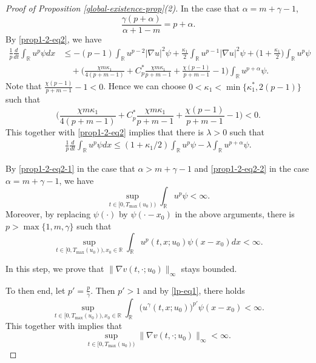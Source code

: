 \documentclass[11pt]{article} %
\theoremstyle{remark}
\theoremstyle{remark}
\numberwithin{equation}{section}
\numberwithin{figure}{section}
\numberwithin{table}{section}
\newcommand\RR{\ensuremath{\mathbb{R}}}
\begin{document}
\begin{proof} [Proof of Proposition \ref{global-existence-prop}(2)]
In the case that  $\alpha=m+\gamma-1$,  
$$
\frac{\gamma(p+\alpha)}{\alpha+1-m}=p+\alpha.
$$ 
By \eqref{prop1-2-eq2}, we
have
 \begin{align*}
\frac{1}{p}\frac{d}{dt}\int_{\RR} u^p \psi dx&\le -(p -1)\int_{\RR} u^{p-2}|\nabla u|^2\psi
+\frac{\kappa_1}{2}\int_{\RR} u^{p-1} |\nabla u|^2 \psi +\big(1+\frac{\kappa_1}{2}\big)\int_{\RR} u^p \psi\nonumber\\
&\quad + \Big(\frac{\chi m \kappa_1}{4(p+m-1)}+C^*_p \frac{\chi m \kappa_1}{p+m-1} +\frac{\chi(p - 1)}{p+m-1}-1\Big)\int_{\RR} u^{p+\alpha}\psi.
    \end{align*}
Note that $\frac{\chi(p - 1)}{p+m-1}-1<0$. Hence we can 
choose $0<\kappa_1<\min\{\kappa_1^*,2(p-1)\}$ such that
$$
\Big(\frac{\chi m \kappa_1}{4(p+m-1)}+C^*_p \frac{\chi m \kappa_1}{p+m-1} +\frac{\chi(p - 1)}{p+m-1}-1\Big)<0.
$$
This together with \eqref{prop1-2-eq2} implies that   there is  $\lambda>0$ such that
\begin{align}
\label{prop1-2-eq2-2}
\frac{1}{p}\frac{d}{dt}\int_{\RR} u^p \psi dx\le 
(1+\kappa_1/2)\int_{\RR} u^p\psi -\lambda \int_{\RR} u^{p+\alpha}\psi.
\end{align}


By \eqref{prop1-2-eq2-1} in the case that $\alpha>m+\gamma-1$ and \eqref{prop1-2-eq2-2} in the case $\alpha=m+\gamma-1$, we have 
\begin{equation*}
\sup_{t\in [0,T_{\max}(u_0))}\int_{\RR} u^p\psi<\infty.
\end{equation*}
Moreover, 
by replacing $\psi(\cdot)$ by $\psi(\cdot-x_0)$ in the above arguments,  there is $p>\max\{1,m,\gamma\}$ such that
\begin{equation}
\label{lp-eq1}
\sup_{t\in [0,T_{\max}(u_0)),x_0\in\RR} \int_{\RR} u^p(t,x;u_0)\psi(x-x_0)dx<\infty.
\end{equation}



 In this step, we  prove that  $ \|\nabla v(t,\cdot;u_0)\|_\infty$ stays bounded.

\smallskip

To then end,
 let  $p'=\frac{p}{\gamma}$. Then $p'>1$ and by \eqref{lp-eq1}, there holds
$$
\sup_{t\in [0,T_{\max}(u_0)),x_0\in\RR} \int_{\RR} \big(u^\gamma(t,x;u_0)\big)^{p'}\psi(x-x_0)<\infty.
$$
This together with   \cite[Theorem 9.11]{GiTr}  implies that
\begin{equation}
\label{lp-eq2}
\sup_{t\in [0,T_{\max}(u_0))} \|\nabla v(t,\cdot;u_0)\|_\infty <\infty.
\end{equation}



\end{proof}
\end{document}
